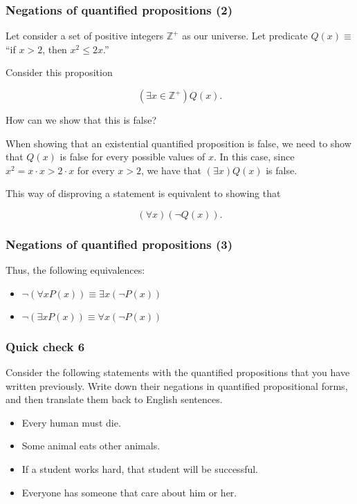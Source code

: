 \begin{frame}\frametitle{Negations of quantified propositions (2)}
  Let consider a set of positive integers $\mathbb Z^+$ as our
  universe.  Let predicate $Q(x)\equiv$ ``if $x > 2$, then  $x^2\leq 2x$.''

  Consider this proposition

  \[(\exists x\in {\mathbb Z^+}) Q(x).\]

  How can we show that this is false? \pause

  When showing that an existential quantified proposition is false, we
  need to show that $Q(x)$ is false for every possible values of $x$.
  In this case, since $x^2 = x\cdot x > 2\cdot x$ for every $x>2$, we
  have that $(\exists x) Q(x)$ is false. \pause

  This way of disproving a statement is equivalent to showing that

  \[(\forall x)(\neg Q(x)).\]
\end{frame}

\begin{frame}\frametitle{Negations of quantified propositions (3)}
  Thus, the following equivalences:

  \begin{itemize}
  \item $\neg(\forall x P(x)) \equiv \exists x (\neg P(x))$
  \item $\neg(\exists x P(x)) \equiv \forall x (\neg P(x))$
  \end{itemize}
\end{frame}

\begin{frame}\frametitle{Quick check 6}
  Consider the following statements with the quantified propositions
  that you have written previously.  Write down their negations in
  quantified propositional forms, and then translate them back to
  English sentences.
  \begin{itemize}
  \item Every human must die.
  \item Some animal eats other animals.
  \item If a student works hard, that student will be successful.
  \item Everyone has someone that care about him or her.
  \end{itemize}                  
\end{frame}
